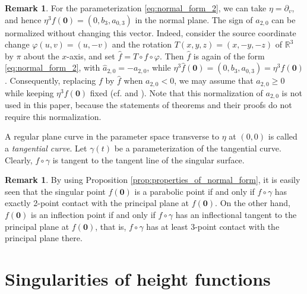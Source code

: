 \documentclass[12pt]{amsart}
\theoremstyle{plain}
\theoremstyle{definition}
\newtheorem{remark}[theorem]{Remark}
\newcommand{\R}{\mathbb{R}}
\renewcommand{\phi}{\varphi}
\renewcommand{\geq}{\geqslant}
\begin{document}
\begin{remark}
For the parameterization \eqref{eq:normal_form_2},
we can take $\eta=\partial_v$, and hence $\eta^3f(\bm{0})=(0,b_3,a_{0,3})$ in the normal plane. 
The sign of $a_{2,0}$ can be normalized without changing this vector.
Indeed, consider the source coordinate change $\phi(u,v)=(u,-v)$ and the rotation $T(x,y,z)=(x,-y,-z)$ of $\R^3$ by $\pi$ about the $x$-axis, and set $\widehat{f}=T\circ f\circ\phi$.
Then $\widehat{f}$ is again of the form \eqref{eq:normal_form_2}, with $\widehat{a}_{2,0}=-a_{2,0}$, while $\eta^3\widehat{f}(\bm{0})=(0,b_3,a_{0,3}) =\eta^3f(\bm{0})$.
Consequently, replacing $f$ by $\widehat{f}$ when $a_{2,0}<0$, we may assume that $a_{2,0}\geq0$ while keeping $\eta^3f(\bm{0})$ fixed (cf. \cite[Introduction]{HHNUY2014} and \cite[Theorem~3.1]{MS2016}). 
Note that this normalization of $a_{2,0}$ is not used in this paper, because the statements of theorems and their proofs do not require this normalization. 
\end{remark}

A regular plane curve in the parameter space transverse to $\eta$ at $(0,0)$ is called a {\it tangential curve}. 
Let $\gamma(t)$ be a parameterization of the tangential curve. 
Clearly, $f\circ\gamma$ is tangent to the tangent line of the singular surface. 

\begin{remark}
By using Proposition \ref{prop:properties_of_normal_form}, it is easily seen that the singular point $f(\bm{0})$ is a parabolic point if and only if $f\circ\gamma$ has exactly 2-point contact with the principal plane at $f(\bm{0})$.
On the other hand, $f(\bm{0})$ is an inflection point if and only if $f\circ\gamma$ has an inflectional tangent to the principal plane at $f(\bm{0})$, that is, $f\circ\gamma$ has at least 3-point contact with the principal plane there.
\end{remark}


\section{Singularities of height functions}
\end{document}

